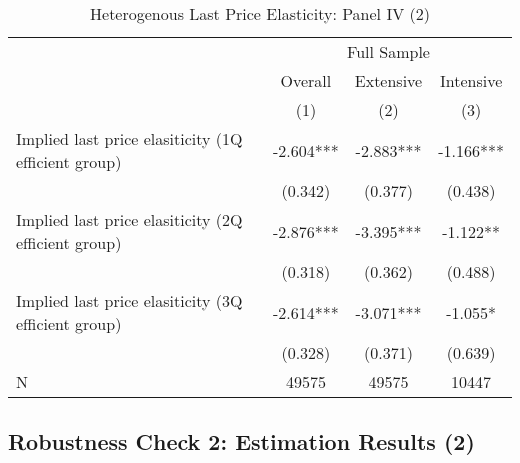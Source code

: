 \documentclass[ review  , 3p ]{elsarticle}
\begin{document}
  \begin{table}

  \caption{\label{tab:kableHeteroLastElasticitySlide2}Heterogenous Last Price Elasticity: Panel IV (2)}
  \centering
  \fontsize{8}{10}\selectfont
  \begin{tabular}[t]{lccc}
  \toprule
  \multicolumn{1}{c}{ } & \multicolumn{3}{c}{Full Sample} \\
  \cmidrule(l{3pt}r{3pt}){2-4}
  \multicolumn{1}{c}{ } & \multicolumn{1}{c}{Overall} & \multicolumn{1}{c}{Extensive} & \multicolumn{1}{c}{Intensive} \\
  \cmidrule(l{3pt}r{3pt}){2-2} \cmidrule(l{3pt}r{3pt}){3-3} \cmidrule(l{3pt}r{3pt}){4-4}
   & (1) & (2) & (3)\\
  \midrule
  Implied last price elasiticity (1Q efficient group) & -2.604*** & -2.883*** & -1.166***\\
   & (0.342) & (0.377) & (0.438)\\
  Implied last price elasiticity (2Q efficient group) & -2.876*** & -3.395*** & -1.122**\\
   & (0.318) & (0.362) & (0.488)\\
  Implied last price elasiticity (3Q efficient group) & -2.614*** & -3.071*** & -1.055*\\
   & (0.328) & (0.371) & (0.639)\\
  N & 49575 & 49575 & 10447\\
  \bottomrule
  \end{tabular}
  \end{table}

  \hypertarget{robustness-check-2-estimation-results-2}{%
  \subsection{Robustness Check 2: Estimation Results (2)}\label{robustness-check-2-estimation-results-2}}
\end{document}
